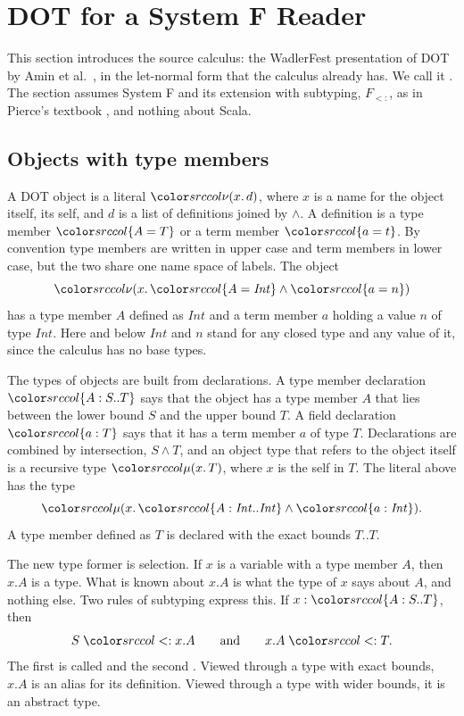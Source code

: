 \mathsrc
\section{DOT for a System F Reader}\label{sec:dot}

This section introduces the source calculus: the WadlerFest presentation of DOT by Amin et al.\ \cite{amin2016essence}, in the let-normal form that the calculus already has. We call it \DOTMNF. The section assumes System F and its extension with subtyping, $F_{<:}$, as in Pierce's textbook \cite{pierce2002tapl}, and nothing about Scala.

\subsection{Objects with type members}

A DOT object is a literal $\dnew{x}{d}$, where $x$ is a name for the object itself, its self, and $d$ is a list of definitions joined by $\wedge$. A definition is a type member $\ddeftyp{A}{T}$ or a term member $\ddeftrm{a}{t}$. By convention type members are written in upper case and term members in lower case, but the two share one name space of labels. The object
\[
\dnew{x}{\ddeftyp{A}{\mathit{Int}} \wedge \ddeftrm{a}{n}}
\]
has a type member $A$ defined as $\mathit{Int}$ and a term member $a$ holding a value $n$ of type $\mathit{Int}$. Here and below $\mathit{Int}$ and $n$ stand for any closed type and any value of it, since the calculus has no base types.

The types of objects are built from declarations. A type member declaration $\dtyp{A}{S}{T}$ says that the object has a type member $A$ that lies between the lower bound $S$ and the upper bound $T$. A field declaration $\dfld{a}{T}$ says that it has a term member $a$ of type $T$. Declarations are combined by intersection, $S \wedge T$, and an object type that refers to the object itself is a recursive type $\dmu{x}{T}$, where $x$ is the self in $T$. The literal above has the type
\[
\dmu{x}{\dtyp{A}{\mathit{Int}}{\mathit{Int}} \wedge \dfld{a}{\mathit{Int}}} .
\]
A type member defined as $T$ is declared with the exact bounds $T..T$.

The new type former is selection. If $x$ is a variable with a type member $A$, then $x.A$ is a type. What is known about $x.A$ is what the type of $x$ says about $A$, and nothing else. Two rules of subtyping express this. If $x : \dtyp{A}{S}{T}$, then
\[
S \sub x.A \qquad\text{and}\qquad x.A \sub T .
\]
The first is called  and the second . Viewed through a type with exact bounds, $x.A$ is an alias for its definition. Viewed through a type with wider bounds, it is an abstract type.

